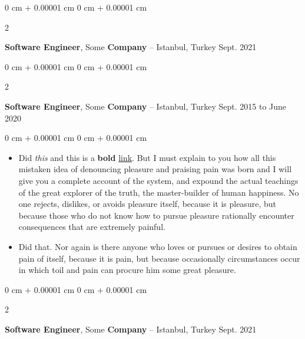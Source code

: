 \documentclass[10pt, letterpaper]{article}
\newenvironment{highlights}{
    \begin{itemize}[
        topsep=0.10 cm,
        parsep=0.10 cm,
        partopsep=0pt,
        itemsep=0pt,
        leftmargin=0 cm + 10pt
    ]
}{
    \end{itemize}
} %
\newenvironment{onecolentry}{
    \begin{adjustwidth}{
        0 cm + 0.00001 cm
    }{
        0 cm + 0.00001 cm
    }
}{
    \end{adjustwidth}
} %
\newenvironment{twocolentry}[2][]{
    \onecolentry
    \def\secondColumn{#2}
    \setcolumnwidth{\fill, 4.5 cm}
    \begin{paracol}{2}
}{
    \switchcolumn \raggedleft \secondColumn
    \end{paracol}
    \endonecolentry
} %
\begin{document}
        \vspace{0.2 cm}

        \begin{twocolentry}{
            Sept. 2021
        }
            \textbf{Software Engineer}, Some \textbf{Company} -- Istanbul, Turkey\end{twocolentry}



        \vspace{0.2 cm}

        \begin{twocolentry}{
            Sept. 2015 to June 2020
        }
            \textbf{Software Engineer}, Some \textbf{Company} -- Istanbul, Turkey\end{twocolentry}

        \vspace{0.10 cm}
        \begin{onecolentry}
            \begin{highlights}
                \item Did \textit{this} and this is a \textbf{bold} \href{https://example.com}{link}. But I must explain to you how all this mistaken idea of denouncing pleasure and praising pain was born and I will give you a complete account of the system, and expound the actual teachings of the great explorer of the truth, the master-builder of human happiness. No one rejects, dislikes, or avoids pleasure itself, because it is pleasure, but because those who do not know how to pursue pleasure rationally encounter consequences that are extremely painful.
                \item Did that. Nor again is there anyone who loves or pursues or desires to obtain pain of itself, because it is pain, but because occasionally circumstances occur in which toil and pain can procure him some great pleasure.
            \end{highlights}
        \end{onecolentry}


        \vspace{0.2 cm}

        \begin{twocolentry}{
            Sept. 2021
        }
            \textbf{Software Engineer}, Some \textbf{Company} -- Istanbul, Turkey\end{twocolentry}
\end{document}
